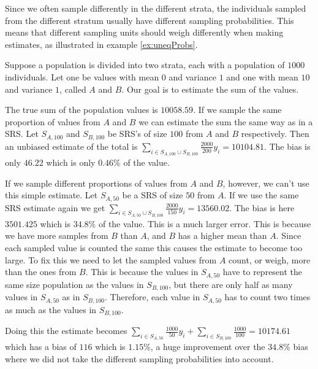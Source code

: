 \documentclass{article}
\begin{document}
Since we often sample differently in the different strata,
the individuals sampled from the different stratum usually have
different sampling probabilities. This means that different sampling units
should weigh differently when making estimates, as illustrated in example \ref{ex:uneqProbs}.

\begin{example} \label{ex:uneqProbs}
  Suppose a population is divided into two strata, each with a population of
  \(1000\) individuals. Let one be values with mean
  \(0\) and variance \(1\) and one with mean \(10\) and variance \(1\), called
  \(A\) and \(B\).
  Our goal is to estimate the sum of the values.

  The true sum of the population values is \(10058.59\). If we sample the same
  proportion of values from \(A\) and \(B\) we can estimate the sum the same way
  as in a SRS. Let \(S_{A, 100}\) and
  \(S_{B, 100}\) be SRS's of size \(100\) from \(A\) and \(B\) respectively.
  Then an unbiased estimate of the total is \(\sum_{i \in S_{A, 100} \cup S_{B,
      100} } \frac{2000}{200} y_i = 10104.81\). The bias is only \(46.22\) which is only \(0.46\%\) of the
  value.

  If we sample different proportions of values from \(A\) and \(B\), however, we
  can't use this simple estimate. Let \(S_{A, 50}\) be a SRS of size \(50\)
  from \(A\). If we use the same SRS estimate again we get \(\sum_{i \in S_{A, 50} \cup S_{B,
      100}} \frac{2000}{150} y_i = 13560.02\). The bias is here \(3501.425\) which is \(34.8\%\) of the
  value. This is a much larger error. This is because we have more samples from
  \(B\) than \(A\), and \(B\) has a higher mean than \(A\). Since each sampled
  value is counted the same this causes the estimate to become too large. To fix
  this we need to let the sampled values from \(A\) count, or weigh, more than
  the ones from \(B\). This is because the values in \(S_{A, 50}\) have to
  represent the same size population as the values in \(S_{B, 100}\), but there
  are only half as many values in \(S_{A, 50}\) as in \(S_{B, 100}\). Therefore,
  each value in \(S_{A, 50}\) has to count two times as much as the values in \(S_{B, 100}\).

  Doing this the estimate becomes \(\sum_{i
    \in S_{A, 50}} \frac{1000}{50} y_i + \sum_{i \in S_{B, 100}}
  \frac{1000}{100} = 10174.61\) which has a bias of \(116\) which is \(1.15\%\),
  a huge improvement over the \(34.8\%\) bias where we did not take the
  different sampling probabilities into account.
\end{example}
\end{document}
